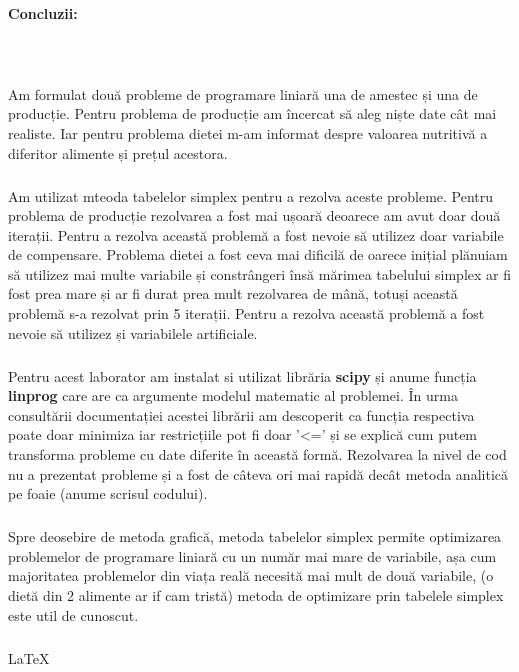 \clearpage
\paragraph{\large Concluzii:}\mbox{}\\

\subparagraph{}{
Am formulat două probleme de programare liniară una de amestec și una de producție.
Pentru problema de producție am încercat să aleg niște date cât mai realiste. Iar pentru problema dietei m-am informat despre valoarea nutritivă a diferitor alimente și prețul acestora.
}

\subparagraph{}{
Am utilizat mteoda tabelelor simplex pentru a rezolva aceste probleme. 
Pentru problema de producție rezolvarea a fost mai ușoară deoarece am avut doar două iterații. Pentru a rezolva această problemă a fost nevoie să utilizez doar variabile de compensare.
Problema dietei a fost ceva mai dificilă de oarece inițial plănuiam să utilizez mai multe variabile și constrângeri însă mărimea tabelului simplex ar fi fost prea mare și ar fi durat prea mult rezolvarea de mână, totuși această problemă s-a rezolvat prin 5 iterații. Pentru a rezolva această problemă a fost nevoie să utilizez și variabilele artificiale.
}


\subparagraph{}{
Pentru acest laborator am instalat si utilizat librăria \textbf{scipy} și anume funcția \textbf{linprog} care are ca argumente modelul matematic al problemei.
În urma consultării documentației acestei librării am descoperit ca funcția respectiva poate doar minimiza iar restricțiile pot fi doar '<=' și se explică cum putem transforma probleme cu date diferite în această formă.
Rezolvarea la nivel de cod nu a prezentat probleme și a fost de câteva ori mai rapidă decât metoda analitică pe foaie (anume scrisul codului).
}

\subparagraph{}{
Spre deosebire de metoda grafică, metoda tabelelor simplex permite optimizarea problemelor de programare liniară cu un număr mai mare de variabile, așa cum majoritatea problemelor din viața reală necesită mai mult de două variabile, (o dietă din 2 alimente ar if cam tristă) metoda de optimizare prin tabelele simplex este util de cunoscut.
}

\vfill
\subparagraph{}{
	\LaTeX
}
